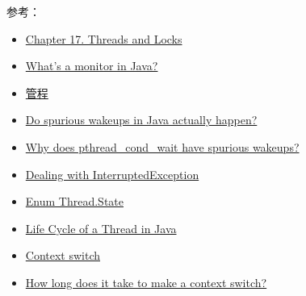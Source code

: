\documentclass[12pt]{article}
\begin{document}
参考：

\begin{itemize}
\tightlist
\item
  \href{https://docs.oracle.com/javase/specs/jls/se7/html/jls-17.html}{Chapter 17. Threads and Locks}
\item
  \href{https://stackoverflow.com/questions/3362303/whats-a-monitor-in-java}{What's a monitor in Java?}
\item
  \href{https://zh.wikipedia.org/wiki/\%E7\%9B\%A3\%E8\%A6\%96\%E5\%99\%A8_(\%E7\%A8\%8B\%E5\%BA\%8F\%E5\%90\%8C\%E6\%AD\%A5\%E5\%8C\%96)}{管程}
\item
  \href{https://stackoverflow.com/questions/1050592/do-spurious-wakeups-in-java-actually-happen}{Do spurious wakeups in Java actually happen?}
\item
  \href{https://stackoverflow.com/questions/8594591/why-does-pthread-cond-wait-have-spurious-wakeups}{Why does pthread\_cond\_wait have spurious wakeups?}
\item
  \href{https://www.ibm.com/developerworks/java/library/j-jtp05236/index.html}{Dealing with InterruptedException}
\item
  \href{https://docs.oracle.com/javase/7/docs/api/java/lang/Thread.State.html}{Enum Thread.State}
\item
  \href{https://www.baeldung.com/java-thread-lifecycle}{Life Cycle of a Thread in Java}
\item
  \href{https://en.wikipedia.org/wiki/Context_switch}{Context switch}
\item
  \href{https://blog.tsunanet.net/2010/11/how-long-does-it-take-to-make-context.html}{How long does it take to make a context switch?}
\end{itemize}
\end{document}
